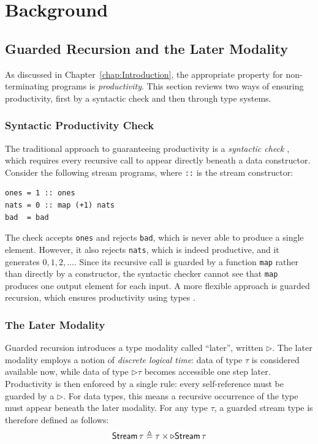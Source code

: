 \chapter{Background}\label{chap:background}

\section{Guarded Recursion and the Later Modality}
\label{sec:bg-guarded}

As discussed in Chapter~\ref{chap:Introduction}, the appropriate property for non-terminating programs is 
\emph{productivity}. This section reviews two ways of ensuring productivity, first by a syntactic
check and then through type systems.

\subsection{Syntactic Productivity Check}
The traditional approach to guaranteeing productivity is a \emph{syntactic check} \citep{coquand93}, which requires every recursive call to
appear directly beneath a data constructor. Consider the following
stream programs, where \texttt{::} is the
stream constructor:

\begin{lstlisting}[style=hs]
ones = 1 :: ones
nats = 0 :: map (+1) nats
bad  = bad
\end{lstlisting}

\noindent
The check accepts \texttt{ones} and rejects \texttt{bad}, which is never
able to produce a single element. However, it also rejects \texttt{nats}, which is indeed productive, and it generates
$0, 1, 2, \ldots$. Since its recursive call is guarded by a function \texttt{map}
rather than directly by a constructor, the syntactic checker cannot see that \texttt{map}
produces one output element for each input. A more flexible approach is guarded recursion, which 
ensures productivity using types \citep{nakanoModalityRecursion2000}.

\subsection{The Later Modality}

Guarded recursion introduces a type modality called ``later'', written
$\triangleright$. The later modality employs a notion of \emph{discrete logical time}: 
data of type $\tau$ is considered available now, while data of type $\triangleright \tau$ becomes accessible one step later. 
Productivity is then enforced by a single rule: every self-reference must
be guarded by a $\triangleright$. For data types, this means a recursive
occurrence of the type must appear beneath the later modality. For any type $\tau$, a guarded stream type is 
therefore defined as follows:
\[ \mathsf{Stream}\,\tau \triangleq \tau \times \triangleright \mathsf{Stream}\,\tau\]

